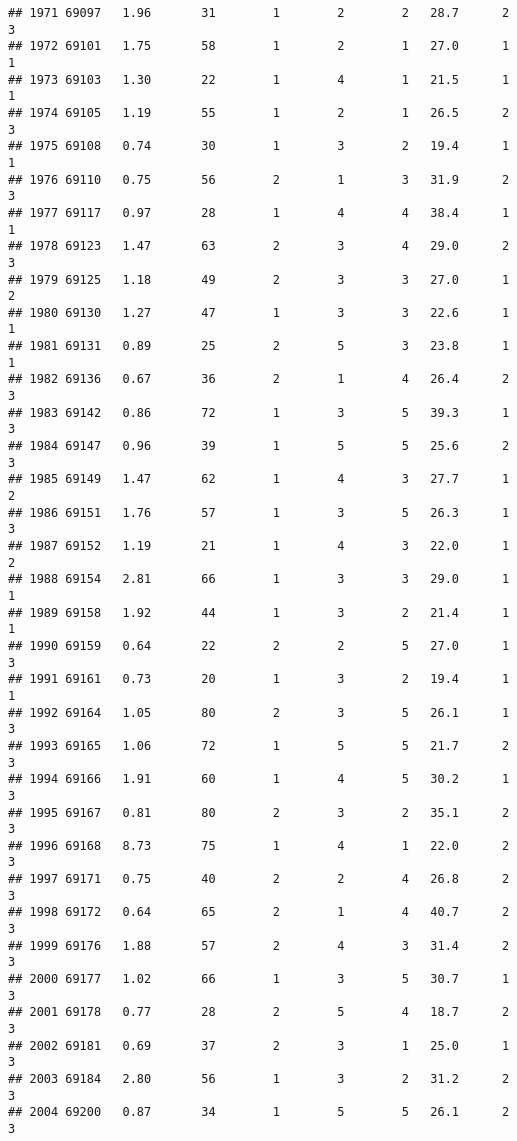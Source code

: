 \documentclass[
]{article}
\begin{document}
\begin{verbatim}
## 1971 69097   1.96       31        1        2        2   28.7      2      3
## 1972 69101   1.75       58        1        2        1   27.0      1      1
## 1973 69103   1.30       22        1        4        1   21.5      1      1
## 1974 69105   1.19       55        1        2        1   26.5      2      3
## 1975 69108   0.74       30        1        3        2   19.4      1      1
## 1976 69110   0.75       56        2        1        3   31.9      2      3
## 1977 69117   0.97       28        1        4        4   38.4      1      1
## 1978 69123   1.47       63        2        3        4   29.0      2      3
## 1979 69125   1.18       49        2        3        3   27.0      1      2
## 1980 69130   1.27       47        1        3        3   22.6      1      1
## 1981 69131   0.89       25        2        5        3   23.8      1      1
## 1982 69136   0.67       36        2        1        4   26.4      2      3
## 1983 69142   0.86       72        1        3        5   39.3      1      3
## 1984 69147   0.96       39        1        5        5   25.6      2      3
## 1985 69149   1.47       62        1        4        3   27.7      1      2
## 1986 69151   1.76       57        1        3        5   26.3      1      3
## 1987 69152   1.19       21        1        4        3   22.0      1      2
## 1988 69154   2.81       66        1        3        3   29.0      1      1
## 1989 69158   1.92       44        1        3        2   21.4      1      1
## 1990 69159   0.64       22        2        2        5   27.0      1      3
## 1991 69161   0.73       20        1        3        2   19.4      1      1
## 1992 69164   1.05       80        2        3        5   26.1      1      3
## 1993 69165   1.06       72        1        5        5   21.7      2      3
## 1994 69166   1.91       60        1        4        5   30.2      1      3
## 1995 69167   0.81       80        2        3        2   35.1      2      3
## 1996 69168   8.73       75        1        4        1   22.0      2      3
## 1997 69171   0.75       40        2        2        4   26.8      2      3
## 1998 69172   0.64       65        2        1        4   40.7      2      3
## 1999 69176   1.88       57        2        4        3   31.4      2      3
## 2000 69177   1.02       66        1        3        5   30.7      1      3
## 2001 69178   0.77       28        2        5        4   18.7      2      3
## 2002 69181   0.69       37        2        3        1   25.0      1      3
## 2003 69184   2.80       56        1        3        2   31.2      2      3
## 2004 69200   0.87       34        1        5        5   26.1      2      3

\end{verbatim}
\end{document}

